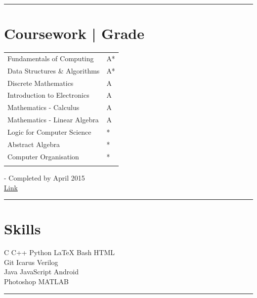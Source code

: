 \documentclass[letterpaper]{Formatting}
\begin{document}
\begin{minipage}[t]{0.3\textwidth}
\sectionspace %
\vspace{-2ex}
\rule{5cm}{0.5pt}
\vspace{2ex}


\section{Coursework | Grade}
\begin{tabular}{lp{1cm}}
Fundamentals of Computing & A*\\
Data Structures \& Algorithms & A*\\
Discrete Mathematics & A\\
Introduction to Electronics & A\\
Mathematics - Calculus & A\\
Mathematics - Linear Algebra & A\\
Logic for Computer Science & *\\
Abstract Algebra & *\\
Computer Organisation & *\\
\multicolumn{2}{c}{} \\
\end{tabular}
\footnotesize * - Completed by April 2015\\\vspace{0.5ex}
 \href{https://drive.google.com/file/d/0B0--s-r8CTxgRHdGMm1iRnQxelU/view}{Link}
\sectionspace %
\vspace{-1ex}
\rule{5cm}{0.5pt}
\vspace{2ex}

\section{Skills}


C \textbullet{} C++ \textbullet{} Python \textbullet{} \LaTeX \textbullet{} Bash \textbullet{} HTML\\
Git \textbullet{} Icarus Verilog \\
Java \textbullet{} JavaScript \textbullet{} Android\\
Photoshop \textbullet{} MATLAB
\sectionspace %
\vspace{-1.5ex}
\rule{5cm}{0.5pt}
\vspace{2ex}


\end{minipage}
\end{document}
